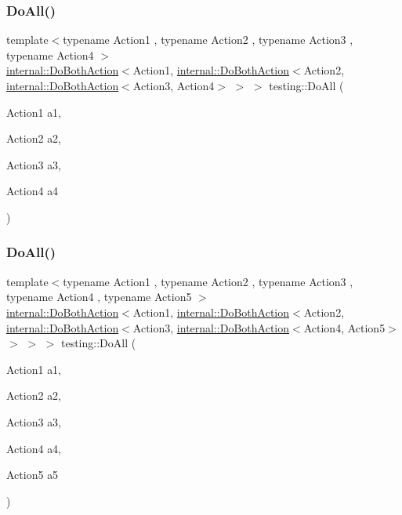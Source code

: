 \subsubsection{\texorpdfstring{Do\+All()}{DoAll()}\hspace{0.1cm}{\footnotesize\ttfamily [3/9]}}
{\footnotesize\ttfamily template$<$typename Action1 , typename Action2 , typename Action3 , typename Action4 $>$ \\
\hyperlink{classtesting_1_1internal_1_1_do_both_action}{internal\+::\+Do\+Both\+Action}$<$Action1, \hyperlink{classtesting_1_1internal_1_1_do_both_action}{internal\+::\+Do\+Both\+Action}$<$Action2, \hyperlink{classtesting_1_1internal_1_1_do_both_action}{internal\+::\+Do\+Both\+Action}$<$Action3, Action4$>$ $>$ $>$ testing\+::\+Do\+All (\begin{DoxyParamCaption}\item[{Action1}]{a1,  }\item[{Action2}]{a2,  }\item[{Action3}]{a3,  }\item[{Action4}]{a4 }\end{DoxyParamCaption})\hspace{0.3cm}{\ttfamily [inline]}}

\mbox{\label{namespacetesting_a794c41d43373d7af9cebbc7f1c5e4a57}} 
\subsubsection{\texorpdfstring{Do\+All()}{DoAll()}\hspace{0.1cm}{\footnotesize\ttfamily [4/9]}}
{\footnotesize\ttfamily template$<$typename Action1 , typename Action2 , typename Action3 , typename Action4 , typename Action5 $>$ \\
\hyperlink{classtesting_1_1internal_1_1_do_both_action}{internal\+::\+Do\+Both\+Action}$<$Action1, \hyperlink{classtesting_1_1internal_1_1_do_both_action}{internal\+::\+Do\+Both\+Action}$<$Action2, \hyperlink{classtesting_1_1internal_1_1_do_both_action}{internal\+::\+Do\+Both\+Action}$<$Action3, \hyperlink{classtesting_1_1internal_1_1_do_both_action}{internal\+::\+Do\+Both\+Action}$<$Action4, Action5$>$ $>$ $>$ $>$ testing\+::\+Do\+All (\begin{DoxyParamCaption}\item[{Action1}]{a1,  }\item[{Action2}]{a2,  }\item[{Action3}]{a3,  }\item[{Action4}]{a4,  }\item[{Action5}]{a5 }\end{DoxyParamCaption})\hspace{0.3cm}{\ttfamily [inline]}}

